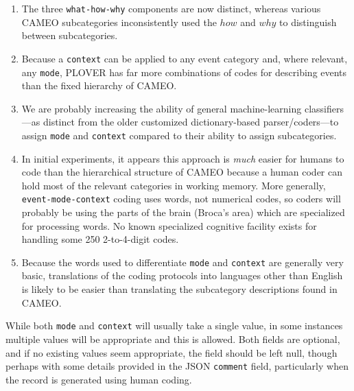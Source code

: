 \documentclass[11pt]{report}
\newcommand{\plcat}[1]{\textsf{#1}}
\newcommand{\txt}[1]{\texttt{#1}}
\begin{document}
\begin{enumerate}

\item The three \texttt{what-how-why} components are now distinct, whereas various CAMEO subcategories inconsistently used the $how$ and $why$ to distinguish between subcategories.

\item Because a \txt{context} can be applied to any event category and, where relevant, any \txt{mode}, PLOVER has far more combinations of codes for describing events than the fixed hierarchy of CAMEO.

\item We are probably increasing the ability of general machine-learning classifiers---as distinct from the older customized dictionary-based parser/coders---to assign \txt{mode} and \txt{context} compared to their ability to assign subcategories.

\item In initial experiments, it appears this  approach is \textit{much} easier for humans to code than the hierarchical structure of CAMEO because a human coder can hold most of the relevant categories in working memory. More generally,  \txt{event-mode-context}  coding uses words, not numerical codes, so coders will probably be using the parts of the brain (Broca's area) which are specialized for processing words. No known specialized cognitive facility exists for handling some 250 2-to-4-digit codes.

\item Because the words used to differentiate \txt{mode} and \txt{context} are generally very basic, translations of the coding protocols into languages other than English is likely to be easier than translating the subcategory descriptions found in CAMEO.
\end{enumerate}

While both \txt{mode} and \txt{context} will usually take a single value, in some instances multiple values will be appropriate and this is allowed. Both fields are optional, and if no existing values seem appropriate, the field should be left null, though perhaps with some details provided in the JSON \texttt{comment} field, particularly when the record is generated using human coding.

\end{document}
